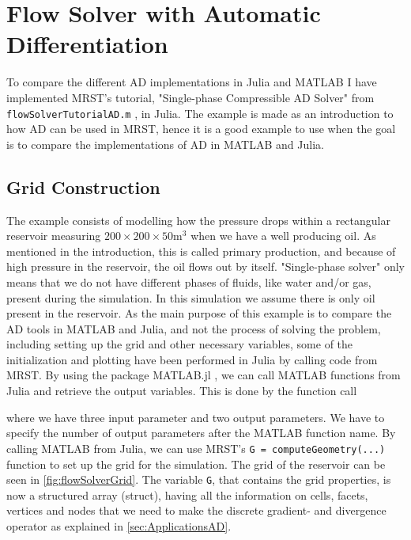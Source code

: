 \chapter{Flow Solver with Automatic Differentiation}
\label{ch:FlowSolver}
To compare the different AD implementations in Julia and MATLAB I have implemented MRST's tutorial, "Single-phase Compressible AD Solver" from \texttt{flowSolverTutorialAD.m} \emph{\citep{flowSolverADExample}}, in Julia. The example is made as an introduction to how AD can be used in MRST, hence it is a good example to use when the goal is to compare the implementations of AD in MATLAB and Julia. 

\section{Grid Construction}
\label{sec:GridConstruction}
The example consists of modelling how the pressure drops within a rectangular reservoir measuring $200\times 200 \times 50 \text{m}^3$ when we have a well producing oil. As mentioned in the introduction, this is called primary production, and because of high pressure in the reservoir, the oil flows out by itself. "Single-phase solver" only means that we do not have different phases of fluids, like water and/or gas, present during the simulation. In this simulation we assume there is only oil present in the reservoir. As the main purpose of this example is to compare the AD tools in MATLAB and Julia, and not the process of solving the problem, including setting up the grid and other necessary variables, some of the initialization and plotting have been performed in Julia by calling code from MRST. By using the package MATLAB.jl \emph{\citep{MATLAB.jl}}, we can call MATLAB functions from Julia and retrieve the output variables. This is done by the function call

where we have three input parameter and two output parameters. We have to specify the number of output parameters after the MATLAB function name.  By calling MATLAB from Julia, we can use MRST's \texttt{G = computeGeometry(...)} function to set up the grid for the simulation. The grid of the reservoir can be seen in \autoref{fig:flowSolverGrid}. The variable \texttt{G}, that contains the grid properties, is now a structured array (struct), having all the information on cells, facets, vertices and nodes that we need to make the discrete gradient- and divergence operator as explained in \autoref{sec:ApplicationsAD}. 


